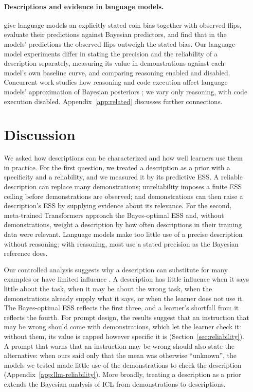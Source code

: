 \documentclass{article}
\theoremstyle{definition}
\begin{document}
\paragraph{Descriptions and evidence in language models.}
\citet{gupta2025} give language models an explicitly stated coin bias together with observed flips, evaluate their predictions against Bayesian predictors, and find that in the models' predictions the observed flips outweigh the stated bias. Our language-model experiments differ in stating the precision and the reliability of a description separately, measuring its value in demonstrations against each model's own baseline curve, and comparing reasoning enabled and disabled. Concurrent work studies how reasoning and code execution affect language models' approximation of Bayesian posteriors \citep{filbry2026}; we vary only reasoning, with code execution disabled. Appendix~\ref{app:related} discusses further connections.

\section{Discussion}\label{sec:discussion}

We asked how descriptions can be characterized and how well learners use them in practice. For the first question, we treated a description as a prior with a specificity and a reliability, and we measured it by its predictive ESS. A reliable description can replace many demonstrations; unreliability imposes a finite ESS ceiling before demonstrations are observed; and demonstrations can then raise a description's ESS by supplying evidence about its relevance. For the second, meta-trained Transformers approach the Bayes-optimal ESS and, without demonstrations, weight a description by how often descriptions in their training data were relevant. Language models make too little use of a precise description without reasoning; with reasoning, most use a stated precision as the Bayesian reference does.

Our controlled analysis suggests why a description can substitute for many examples \citep{honda2025} or have limited influence \citep{webson2022,gupta2025,gloaguen2026}. A description has little influence when it says little about the task, when it may be about the wrong task, when the demonstrations already supply what it says, or when the learner does not use it. The Bayes-optimal ESS reflects the first three, and a learner's shortfall from it reflects the fourth. For prompt design, the results suggest that an instruction that may be wrong should come with demonstrations, which let the learner check it: without them, its value is capped however specific it is (Section~\ref{sec:reliability}). A prompt that warns that an instruction may be wrong should also state the alternative: when ours said only that the mean was otherwise ``unknown'', the models we tested made little use of the demonstrations to check the description (Appendix~\ref{app:llm-reliability}). More broadly, treating a description as a prior extends the Bayesian analysis of ICL from demonstrations to descriptions.
\end{document}

